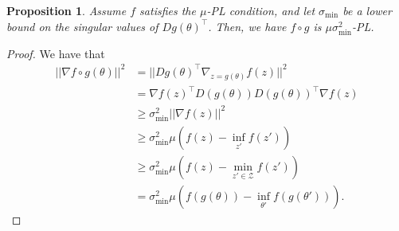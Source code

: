 \documentclass{article} %
\newtheorem{proposition}[theorem]{Proposition}
\theoremstyle{definition}
\begin{document}
{
\renewcommand{\thetheorem}{\ref{thm:pl}}
\begin{proposition}
    Assume $f$ satisfies the $\mu$-PL condition, and let $\sigma_{\min}$ be a lower bound on the singular values of $Dg(\theta)^\top$. Then, we have $f \circ g$ is $\mu \sigma^2_{\min}$-PL.
\end{proposition}
}
\begin{proof}
We have that 
\begin{align*}
 || \nabla f \circ g (\theta)||^2 &= ||Dg(\theta)^\top \nabla_{z=g(\theta)} f(z)||^2 \\
 &=\nabla f(z)^\top D(g(\theta)) D(g(\theta))^\top \nabla f(z)\\
 &\geq \sigma_{\min}^2||\nabla f(z)||^2   \\
 &\geq \sigma_{\min}^2 \mu(f(z)-\inf_{z'} f(z')) \\
    &\geq \sigma_{\min}^2 \mu(f(z)-\min_{z' \in \mathcal{Z}} f(z')) \\
 &= \sigma_{\min}^2 \mu (f(g(\theta))- \inf_{\theta'}f(g(\theta'))).
\end{align*}
\end{proof}
\end{document}
